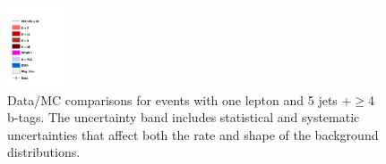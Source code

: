 \begin{figure}[hbtp]
\begin{center}
   \includegraphics[width=0.15\textwidth]{Figures/Analysis_2_Diagrams/LJ_plots_lep/ttH_legend_1columns.pdf}
   \caption{Data/MC comparisons for events with one lepton and 5 jets +$\ge$4 b-tags.  The uncertainty band includes statistical and systematic uncertainties that affect both the rate and shape of the background distributions.}
   \label{fig:lj_input_II_5j4t_2}
 \end{center}
\end{figure}

\clearpage





